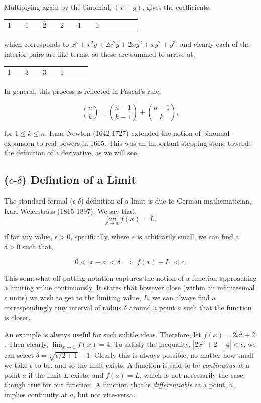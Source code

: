 \documentclass[11pt]{amsart}
\begin{document}
Multiplying again by the binomial, $(x + y)$, gives the coefficients,

\begin{center}
\begin{tabular}{cccccccccccccccc}
1&&1&&2&&2&&1&&1 \\
\end{tabular}
\end{center}

which corresponds to $x^3 + x^2y + 2x^2y + 2xy^2 + xy^2 + y^3$, and clearly each of the interior pairs are like terms, so these are summed to arrive at,

\begin{center}
\begin{tabular}{cccccccccc}
1&&3&&3&&1 \\
\end{tabular}
\end{center}

In general, this process is reflected in Pascal's rule,

$${{n}\choose{k}} = {{n-1}\choose{k-1}} + {{n-1}\choose{k}},$$
		
for $1 \leq k \leq n$. Isaac Newton (1642-1727) extended the notion of binomial expansion to real powers in 1665. This was an important stepping-stone towards the definition of a derivative, as we will see.

\subsection{($\epsilon$-$\delta$) Defintion of a Limit}

The standard formal ($\epsilon$-$\delta$) definition of a limit is due to German mathematician, Karl Weierstrass (1815-1897). We say that, $$\lim_{x \to a} f(x) = L,$$

if for any value, $\epsilon > 0$, specifically, where $\epsilon$ is arbitrarily small, we can find a $\delta > 0$ such that,

$$0 < |x - a| < \delta \implies |f(x) - L| < \epsilon.$$

This somewhat off-putting notation captures the notion of a function approaching a limiting value continuously. It states that however close (within an infinitesimal $\epsilon$ units) we wish to get to the limiting value, $L$, we can always find a correspondingly tiny interval of radius $\delta$ around a point $a$ such that the function is closer.

An example is always useful for such subtle ideas. Therefore, let $f(x) = 2x^2 + 2$. Then clearly, $\lim_{x \to 1} f(x) = 4$. To satisfy the inequality, $|2x^2 + 2 - 4| < \epsilon$, we can select $\delta = \sqrt{\epsilon/2 + 1} - 1$. Clearly this is always possible, no matter how small we take $\epsilon$ to be, and so the limit exists. A function is said to be \emph{continuous} at a point $a$ if the limit $L$ exists, and $f(a) = L$, which is not necessarily the case, though true for our function. A function that is \emph{differentiable} at a point, $a$, implies continuity at $a$, but not vice-versa.
\end{document}
